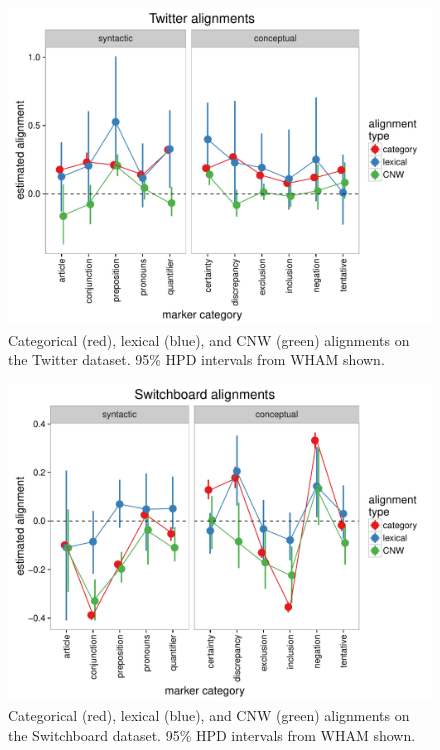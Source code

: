 \documentclass[11pt]{article}
\begin{document}
{\begin{figure}[t]
  \begin{center}
    \includegraphics[width=\columnwidth]{results/twitter_line.pdf}
  \end{center}
  \caption{Categorical (red), lexical (blue), and CNW (green) alignments on the Twitter dataset. 95\% HPD intervals from WHAM shown.}\label{fig:twitter-res}
\end{figure}

\begin{figure}[t]
  \begin{center}
    \includegraphics[width=\columnwidth]{results/swbda_line.pdf}
  \end{center}
  \caption{Categorical (red), lexical (blue), and CNW (green) alignments on the Switchboard dataset. 95\% HPD intervals from WHAM shown.}\label{fig:swbda-res}
\end{figure}

}
\end{document}
